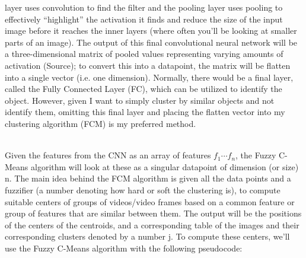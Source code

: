 \documentclass[10pt,twocolumn]{article}
\begin{document}
layer uses convolution to find the filter and the pooling layer uses pooling to effectively “highlight” the activation it finds and reduce the size of the input image before it reaches the inner layers (where often you’ll be looking at smaller parts of an image). The output of this final convolutional neural network will be a three-dimensional matrix of pooled values representing varying amounts of activation (Source); to convert this into a datapoint, the matrix will be flatten into a single vector (i.e. one dimension). Normally, there would be a final layer, called the Fully Connected Layer (FC), which can be utilized to identify the object. However, given I want to simply cluster by similar objects and not identify them, omitting this final layer and placing the flatten vector into my clustering algorithm (FCM) is my preferred method.

\\
\indent Given the features from the CNN as an array of features \(f_{1} \cdots f_{n}\), the Fuzzy C-Means algorithm will look at these as a singular datapoint of dimension (or size) n. The main idea behind the FCM algorithm is given all the data points and a fuzzifier (a number denoting how hard or soft the clustering is), to compute suitable centers of groups of videos/video frames based on a common feature or group of features that are similar between them. The output will be the positions of the centers of the centroids, and a corresponding table of the images and their corresponding clusters denoted by a number j. To compute these centers, we’ll use the Fuzzy C-Means algorithm with the following pseudocode:

	
	
\end{document}
